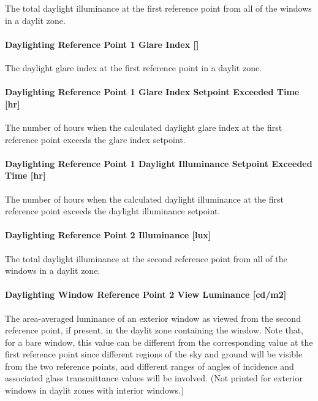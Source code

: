 The total daylight illuminance at the first reference point from all of the windows in a daylit zone.

\paragraph{Daylighting Reference Point 1 Glare Index {[]}}\label{daylighting-reference-point-1-glare-index}

The daylight glare index at the first reference point in a daylit zone.

\paragraph{Daylighting Reference Point 1 Glare Index Setpoint Exceeded Time {[}hr{]}}\label{daylighting-reference-point-1-glare-index-setpoint-exceeded-time-hr}

The number of hours when the calculated daylight glare index at the first reference point exceeds the glare index setpoint.

\paragraph{Daylighting Reference Point 1 Daylight Illuminance Setpoint Exceeded Time {[}hr{]}}\label{daylighting-reference-point-1-daylight-illuminance-setpoint-exceeded-time-hr}

The number of hours when the calculated daylight illuminance at the first reference point exceeds the daylight illuminance setpoint.

\paragraph{Daylighting Reference Point 2 Illuminance {[}lux{]}}\label{daylighting-reference-point-2-illuminance-lux}

The total daylight illuminance at the second reference point from all of the windows in a daylit zone.

\paragraph{Daylighting Window Reference Point 2 View Luminance {[}cd/m2{]}}\label{daylighting-window-reference-point-2-view-luminance-cdm2}

The area-averaged luminance of an exterior window as viewed from the second reference point, if present, in the daylit zone containing the window. Note that, for a bare window, this value can be different from the corresponding value at the first reference point since different regions of the sky and ground will be visible from the two reference points, and different ranges of angles of incidence and associated glass transmittance values will be involved. (Not printed for exterior windows in daylit zones with interior windows.)


